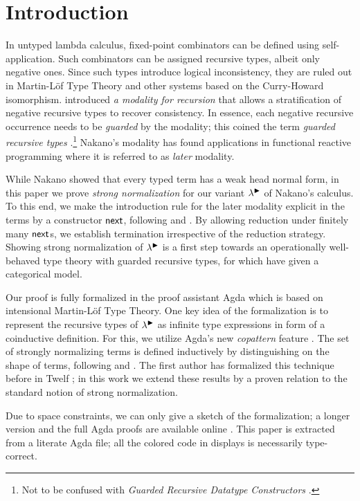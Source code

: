 
\section{Introduction}
\label{sec:intro}

In untyped lambda calculus, fixed-point combinators can be defined
using self-app\-li\-ca\-tion.  Such combinators can be assigned recursive
types, albeit only negative ones.  Since such types introduce logical
inconsistency, they are ruled out in Martin-L\"of
Type Theory and other systems based on the Curry-Howard isomorphism.
\citet{nakano:lics00} introduced \emph{a modality for recursion} that
allows a stratification of negative recursive types to recover
consistency.  In essence, each negative recursive occurrence needs to
be \emph{guarded} by the modality; this coined the term \emph{guarded
  recursive types} \citep{birkedalMogelberg:lics13}.\footnote{Not to
  be confused with \emph{Guarded Recursive Datatype Constructors}
  \citep{xiChenChen:popl03}.} 
Nakano's modality has found applications in functional reactive
programming \citep{krishnaswamiBenton:lics11} where it is referred to
as \emph{later} modality.

While Nakano showed that every typed term has a weak head normal form,
in this paper we prove \emph{strong normalization} for our variant
$\lambda^{\mathord{\blacktriangleright}}$ of Nakano's calculus.  
To this end, we
make the introduction rule for the later modality explicit in the
terms by a constructor $\mathsf{next}$, following
\citet{birkedalMogelberg:lics13} and \citet{atkeyMcBride:icfp13}.  By
allowing reduction under finitely many $\mathsf{next}$s, we establish
termination irrespective of the reduction strategy.  
%
Showing strong normalization of $\lambda^{\mathord{\blacktriangleright}}$ is a first step towards
an operationally well-behaved type theory with guarded recursive types, for
which \citet{birkedalMogelberg:lics13} have given a categorical model.

Our proof is fully formalized in the proof assistant Agda
\citeyearpar{agda24} which is based on intensional Martin-L\"of Type Theory.
One key idea of the formalization is to represent the recursive types
of $\lambda^{\mathord{\blacktriangleright}}$ as infinite type expressions in form of a
coinductive definition.  For this, we utilize Agda's new
\emph{copattern} feature \citep{abelPientkaThibodeauSetzer:popl13}.  
The set of strongly normalizing terms is defined inductively by
distinguishing on the shape of terms, following
\citet{raamsdonk:perpetualReductions} and \citet{matthes:shortproofs}.  The first author has
formalized this technique before in Twelf \citep{abel:entcs04};
in this work we extend these results by a  
proven relation to the standard notion of strong normalization. 

Due to space constraints, we can only give a sketch of the
formalization; a longer version and
the full Agda proofs 
are available online
\citep{abelVezzosi:guardedNormalization}.
This paper is extracted from a literate Agda file; all the colored
code in displays is necessarily type-correct.

